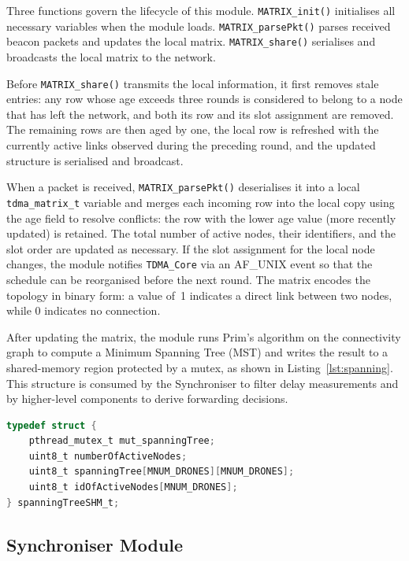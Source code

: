 Three functions govern the lifecycle of this module. \texttt{MATRIX\_init()} initialises all
necessary variables when the module loads. \texttt{MATRIX\_parsePkt()} parses received beacon
packets and updates the local matrix. \texttt{MATRIX\_share()} serialises and broadcasts the
local matrix to the network.

Before \texttt{MATRIX\_share()} transmits the local information, it first removes stale entries:
any row whose age exceeds three rounds is considered to belong to a node that has left the
network, and both its row and its slot assignment are removed. The remaining rows are then
aged by one, the local row is refreshed with the currently active links observed during the
preceding round, and the updated structure is serialised and broadcast.

When a packet is received, \texttt{MATRIX\_parsePkt()} deserialises it into a local
\texttt{tdma\_matrix\_t} variable and merges each incoming row into the local copy using the
age field to resolve conflicts: the row with the lower age value (more recently updated) is
retained. The total number of active nodes, their identifiers, and the slot order are updated as
necessary. If the slot assignment for the local node changes, the module notifies
\texttt{TDMA\_Core} via an AF\_UNIX event so that the schedule can be reorganised before
the next round. The matrix encodes the topology in binary form: a value of~1 indicates a direct
link between two nodes, while 0 indicates no connection.

After updating the matrix, the module runs Prim's algorithm on the connectivity graph to compute
a Minimum Spanning Tree (MST) and writes the result to a shared-memory region protected by
a mutex, as shown in Listing~\ref{lst:spanning}. This structure is consumed by the Synchroniser
to filter delay measurements and by higher-level components to derive forwarding decisions.

\begin{lstlisting}[language=C,
    caption={Variables stored in the shared memory for the Spanning Tree~\cite{almeida2023synchronization}},
    label={lst:spanning}]
typedef struct {
    pthread_mutex_t mut_spanningTree;
    uint8_t numberOfActiveNodes;
    uint8_t spanningTree[MNUM_DRONES][MNUM_DRONES];
    uint8_t idOfActiveNodes[MNUM_DRONES];
} spanningTreeSHM_t;
\end{lstlisting}

\subsection{Synchroniser Module}

